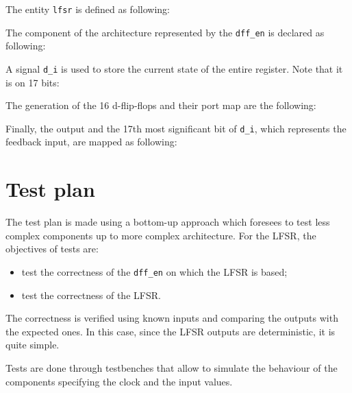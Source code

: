 \documentclass[11pt,a4paper,oneside, openright]{article}
\begin{document}
The entity \texttt{lfsr} is defined as following:



The component of the architecture represented by the \texttt{dff\_en} is declared as following:



A signal \texttt{d\_i} is used to store the current state of the entire register. Note that it is on 17 bits:



The generation of the 16 d-flip-flops and their port map are the following:



Finally, the output and the 17th most significant bit of \texttt{d\_i}, which represents the feedback input, are mapped as following:

 

\newpage

\section{Test plan}
The test plan is made using a bottom-up approach which foresees to test less complex components up to more complex architecture. For the LFSR, the objectives of tests are:
\begin{itemize}
    \item test the correctness of the \texttt{dff\_en} on which the LFSR is based;
    \item test the correctness of the LFSR.
\end{itemize}

The correctness is verified using known inputs and comparing the outputs with the expected ones. In this case, since the LFSR outputs are deterministic, it is quite simple.
 
Tests are done through testbenches that allow to simulate the behaviour of the components specifying the clock and the input values.
\end{document}
